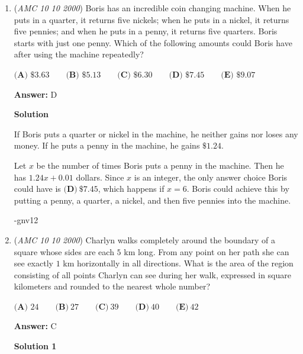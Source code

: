 \begin{enumerate}
 Extend line $\overline{DC}$ as above.  This creates two similar triangles whose side lengths have the ratio $5:4$.  Therefore $AE=\frac{5}{9}AB$.  Using Pythagorean theorem to find $AB$ gives us:

 
 \[AE=\frac{5}{9}AB=\frac{5}{9}\sqrt{3^2+6^2}=\frac{5}{9}\sqrt{45}= \boxed{\textbf{(B) }\frac{5\sqrt{5}}{3}}\]



	\item (\textit{AMC 10 10 2000}) Boris has an incredible coin changing machine. When he puts in a quarter, it returns five nickels; when he puts in a nickel, it returns five pennies; and when he puts in a penny, it returns five quarters. Boris starts with just one penny. Which of the following amounts could Boris have after using the machine repeatedly?


 $\textbf{(A) } \$3.63  \qquad \textbf{(B) } \$5.13 \qquad \textbf{(C) } \$6.30 \qquad \textbf{(D) } \$7.45 \qquad \textbf{(E) } \$9.07$

 \textbf{Answer: }D



\textbf{Solution}

If Boris puts a quarter or nickel in the machine, he neither gains nor loses any money.  If he puts a penny in the machine, he gains $\$1.24$.

 Let $x$ be the number of times Boris puts a penny in the machine.  Then he has $1.24x+0.01$ dollars.  Since $x$ is an integer, the only answer choice Boris could have is $\boxed{\textbf{(D)}\ \$7.45}$, which happens if $x = 6$.  Boris could achieve this by putting a penny, a quarter, a nickel, and then five pennies into the machine.

 -gnv12

 


	\item (\textit{AMC 10 10 2000}) Charlyn walks completely around the boundary of a square whose sides are each $5$ km long. From any point on her path she can see exactly $1$ km horizontally in all directions. What is the area of the region consisting of all points Charlyn can see during her walk, expressed in square kilometers and rounded to the nearest whole number?


 $\textbf{(A) } 24 \qquad\textbf{(B)}\ 27 \qquad\textbf{(C)}\ 39 \qquad\textbf{(D)}\ 40 \qquad\textbf{(E)}\ 42$

 \textbf{Answer: }C



\textbf{Solution 1}


\end{enumerate}
